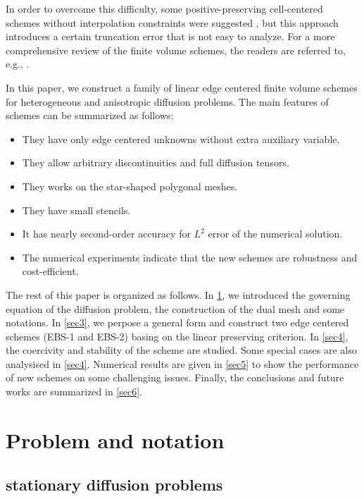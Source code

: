 \documentclass[times,review,preprint,authoryear]{elsarticle}
\begin{document}
In order to overcome this difficulty, some positive-preserving cell-centered schemes without interpolation constraints were suggested \cite{J. Wu-Z. Gao, Z. Gao-J. Wu, Schneider2017}, but this approach introduces a certain  truncation error that is not easy to analyze. For a more  comprehensive review of the finite volume schemes, the readers are referred to, e.g., \cite{Droniou2014, Schneider2018}.









In this paper, we construct a family of linear edge centered finite volume schemes for heterogeneous and anisotropic diffusion problems. The main features of schemes can be summarized as follows:
\begin{itemize}
\item They have only edge centered unknowns without extra auxiliary variable.
\item They allow arbitrary discontinuities and full diffusion tensors.
\item They works on the star-shaped polygonal meshes.
\item They have small stencils.
\item It has nearly second-order accuracy for $L^2$ error of the numerical solution.
\item The numerical experiments indicate that the new schemes are robustness and cost-efficient.
\end{itemize}

The rest of this paper is organized as follows. In \cref{sec2}, we introduced the governing equation of the diffusion problem, the construction of the dual mesh and some notations. In \cref{sec3}, we perpose a general form and construct two edge centered schemes (EBS-1 and EBS-2) basing on the linear preserving criterion. In \cref{sec4}, the coercivity and stability of the scheme are studied. Some special cases are also analysised in \cref{sec4}. Numerical results are given in \cref{sec5} to show the performance of new schemes on some challenging issues. Finally, the conclusions and future works are summarized in \cref{sec6}.

\section{Problem and notation}\label{sec2}

\subsection{stationary diffusion problems}\label{sec:prob}
\end{document}
